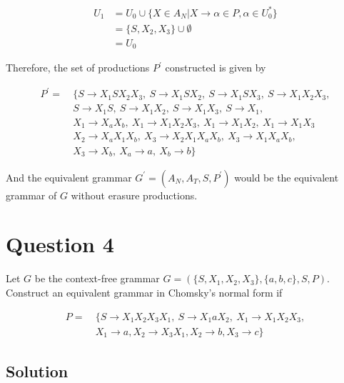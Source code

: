 \begin{equation}
\begin{aligned}
U_{1} &= U_{0} \cup \{X\in A_N | X\rightarrow \alpha \in P, \alpha \in U^*_0\}\\
&= \{S, X_2, X_3\} \cup \emptyset\\
&= U_{0}
\end{aligned}
\end{equation}

Therefore, the set of productions $P^\prime$ constructed is given by

\begin{equation}
\begin{aligned}
P^\prime =\ & \{S\rightarrow X_1SX_2X_3,\ S\rightarrow X_1SX_2,\ S\rightarrow X_1SX_3,\ S\rightarrow X_1X_2X_3,\\
& S\rightarrow X_1S,\ S\rightarrow X_1X_2,\ S\rightarrow X_1X_3,\ S\rightarrow X_1,\\
& X_1 \rightarrow X_aX_b,\ X_1\rightarrow X_1X_2X_3,\ X_1 \rightarrow X_1X_2,\ X_1 \rightarrow X_1X_3\\
& X_2 \rightarrow X_aX_1X_b,\ X_3\rightarrow X_2X_1X_aX_b,\ X_3\rightarrow X_1X_aX_b,\\
& X_3 \rightarrow X_b,\ X_a\rightarrow a,\ X_b \rightarrow b\}
\end{aligned}
\end{equation}

And the equivalent grammar $G^\prime=(A_N, A_T, S, P^\prime)$ would be the equivalent grammar of $G$ without erasure productions.

\section*{Question 4}

Let $ G $ be the context-free grammar $G = (\{S,X_1,X_2,X_3\},\{a,b,c\},S,P)$.
Construct an equivalent grammar in Chomsky's normal form if

\begin{equation}
\begin{aligned}
P =\ & \{ S\rightarrow X_1 X_2 X_3 X_1,\ S\rightarrow X_1 a X_2,\ X_1 \rightarrow X_1 X_2 X_3,\\
& X_1 \rightarrow a, X_2 \rightarrow X_3 X_1, X_2 \rightarrow b, X_3 \rightarrow c\}
\end{aligned}
\end{equation}

\subsection*{Solution}

